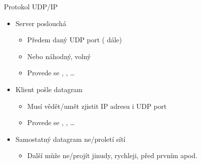 \begin{frame}{Protokol UDP/IP}

  \begin{itemize}
    \item Server poslouchá
    \begin{itemize}
      \item Předem daný UDP port ( dále)
      \item Nebo náhodný, volný

      \pause

      \item Provede se , , \dots
    \end{itemize}

    \pause

    \item Klient pošle datagram
    \begin{itemize}
      \item Musí vědět/umět zjistit IP adresu i UDP port

      \pause

      \item Provede se , , \dots
    \end{itemize}

    \pause

    \item Samostatný datagram ne/proletí sítí
    \begin{itemize}
      \item Další může ne/projít jinudy, rychleji, před prvním apod.
    \end{itemize}
  \end{itemize}

\end{frame}

